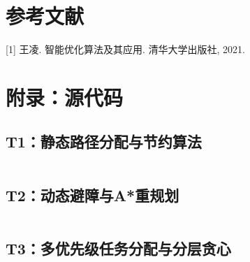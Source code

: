 \documentclass[12pt,fontset=adobe]{ctexart}
\begin{document}
\section{参考文献}
[1] 王凌. 智能优化算法及其应用. 清华大学出版社, 2021.  \\

\section*{附录：源代码}

\subsection*{T1：静态路径分配与节约算法}

\inputminted[fontsize=\scriptsize]{python3}{../VRP/T1.py}

\subsection*{T2：动态避障与A*重规划}
\inputminted[fontsize=\scriptsize]{python3}{../VRP/T2.py}

\subsection*{T3：多优先级任务分配与分层贪心}
\inputminted[fontsize=\scriptsize]{python3}{../VRP/T3.py}
\end{document}
